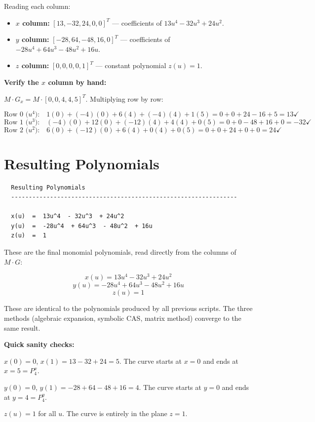 \documentclass[12pt, a4paper]{article}
\begin{document}
Reading each column:
\begin{itemize}
  \item \textbf{$x$ column:} $[13, -32, 24, 0, 0]^T$
        --- coefficients of $13u^4 - 32u^3 + 24u^2$.
  \item \textbf{$y$ column:} $[-28, 64, -48, 16, 0]^T$
        --- coefficients of $-28u^4 + 64u^3 - 48u^2 + 16u$.
  \item \textbf{$z$ column:} $[0, 0, 0, 0, 1]^T$
        --- constant polynomial $z(u) = 1$.
\end{itemize}

\begin{examplebox}
\textbf{Verify the $x$ column by hand:}

$M \cdot G_x = M \cdot [0, 0, 4, 4, 5]^T$.
Multiplying row by row:

\[
  \text{Row 0 (}u^4\text{):}\quad
  1(0)+(-4)(0)+6(4)+(-4)(4)+1(5) = 0+0+24-16+5 = 13 \checkmark
\]
\[
  \text{Row 1 (}u^3\text{):}\quad
  (-4)(0)+12(0)+(-12)(4)+4(4)+0(5) = 0+0-48+16+0 = -32 \checkmark
\]
\[
  \text{Row 2 (}u^2\text{):}\quad
  6(0)+(-12)(0)+6(4)+0(4)+0(5) = 0+0+24+0+0 = 24 \checkmark
\]
\end{examplebox}


\section{Resulting Polynomials}

\begin{verbatim}
  Resulting Polynomials
  ----------------------------------------------------------------

  x(u)  =  13u^4  - 32u^3  + 24u^2
  y(u)  =  -28u^4  + 64u^3  - 48u^2  + 16u
  z(u)  =  1
\end{verbatim}

These are the final monomial polynomials, read directly from
the columns of $M \cdot G$:

\[
  x(u) = 13u^4 - 32u^3 + 24u^2
\]
\[
  y(u) = -28u^4 + 64u^3 - 48u^2 + 16u
\]
\[
  z(u) = 1
\]

These are identical to the polynomials produced by all
previous scripts.
The three methods (algebraic expansion, symbolic CAS,
matrix method) converge to the same result.

\begin{notebox}
\textbf{Quick sanity checks:}

$x(0) = 0$, $x(1) = 13 - 32 + 24 = 5$.
The curve starts at $x=0$ and ends at $x=5 = P_4^x$. \checkmark

$y(0) = 0$, $y(1) = -28 + 64 - 48 + 16 = 4$.
The curve starts at $y=0$ and ends at $y=4 = P_4^y$. \checkmark

$z(u) = 1$ for all $u$.
The curve is entirely in the plane $z=1$. \checkmark
\end{notebox}
\end{document}
